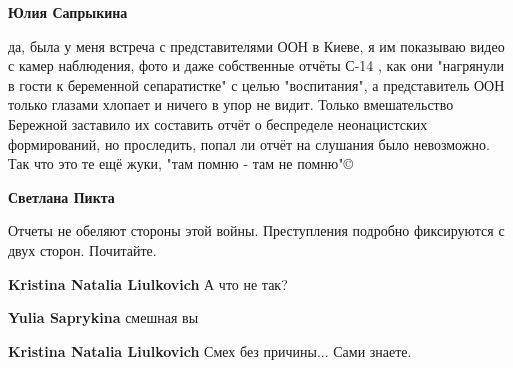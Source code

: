 \begin{itemize}
\begin{itemize}
 
\textbf{Юлия Сапрыкина} 

да, была у меня встреча с представителями ООН в Киеве, я им показываю видео с
камер наблюдения, фото и даже собственные отчёты С-14 , как они "нагрянули в
гости к беременной сепаратистке" с целью "воспитания", а представитель ООН
только глазами хлопает и ничего в упор не видит. Только вмешательство Бережной
заставило их составить отчёт о беспределе неонацистских формирований, но
проследить, попал ли отчёт на слушания было невозможно. Так что это те ещё
жуки, "там помню - там не помню"©


 
\textbf{Светлана Пикта} 

Отчеты не обеляют стороны этой войны. Преступления подробно фиксируются с двух
сторон. Почитайте.


 
\textbf{Kristina Natalia Liulkovich} А что не так?

 
\textbf{Yulia Saprykina} смешная вы \Smiley[1.0][yellow]

 
\textbf{Kristina Natalia Liulkovich} Смех без причины... Сами знаете.


\end{itemize}
\end{itemize}
